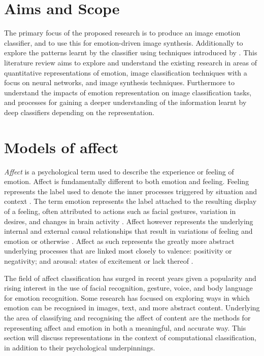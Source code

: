 \documentclass{article}
\begin{document}
\section{Aims and Scope}

The primary focus of the proposed research is to produce an image emotion classifier, and to use this for emotion-driven image synthesis.
Additionally to explore the patterns learnt by the classifier using techniques introduced by \citet{nguyen2015deep,nguyen2015innovation}.
This literature review aims to explore and understand the existing research in areas of quantitative representations of emotion, image classification techniques with a focus on neural networks, and image synthesis techniques.
Furthermore to understand the impacts of emotion representation on image classification tasks, and processes for gaining a deeper understanding of the information learnt by deep classifiers depending on the representation.


\section{Models of affect}

\textit{Affect} is a psychological term used to describe the experience or feeling of emotion.
Affect is fundamentally different to both emotion and feeling.
Feeling represents the label used to denote the inner processes triggered by situation and context \citep{shouse2005feeling}.
The term emotion represents the label attached to the resulting display of a feeling, often attributed to actions such as facial gestures, variation in desires, and changes in brain activity \citep{sloman2001beyond}.
Affect however represents the underlying internal and external causal relationships that result in variations of feeling and emotion or otherwise \citep{russell2003core}.
Affect as such represents the greatly more abstract underlying processes that are linked most closely to valence: positivity or negativity; and arousal: states of excitement or lack thereof \citep{russell2003core}.

The field of affect classification has surged in recent years given a popularity and rising interest in the use of facial recognition, gesture, voice, and body language for emotion recognition.
Some research has focused on exploring ways in which emotion can be recognised in images, text, and more abstract content.
Underlying the area of classifying and recognising the affect of content are the methods for representing affect and emotion in both a meaningful, and accurate way.
This section will discuss representations in the context of computational classification, in addition to their psychological underpinnings.
\end{document}
